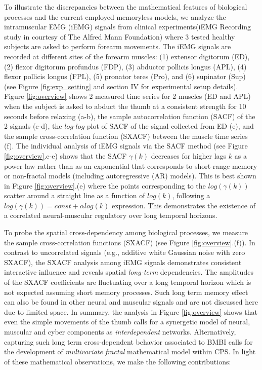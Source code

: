 To illustrate the discrepancies between the mathematical features of biological processes and the current employed memoryless models, we analyze the intramuscular EMG (iEMG) signals from clinical experiments(iEMG Recording study in courtesy of The Alfred Mann Foundation)  where 3 tested healthy subjects are asked to perform forearm movements. The iEMG signals are recorded at different sites of the forearm muscles: (1) extensor digitorum (ED), (2) flexor digitorum profundus (FDP), (3) abductor pollicis longus (APL), (4) flexor pollicis longus (FPL), (5) pronator teres (Pro), and (6) supinator (Sup) (see Figure \ref{fig:exp_setting} and section IV for experimental setup details). Figure \ref{fig:overview} shows 2 measured time series for 2 muscles (ED and APL) when the subject is asked to abduct the thumb at a consistent strength for 10 seconds before relaxing (a-b), the sample autocorrelation function (SACF) of the 2 signals (c-d), the $log$-$log$ plot of SACF of the signal collected from ED (e), and the sample cross-correlation function (SXACF) between the muscle time series (f). The individual analysis of iEMG signals via the SACF method (see Figure \ref{fig:overview}.c-e) shows that the SACF $\gamma(k)$ decreases for higher lags $k$ as a power law rather than as an exponential that corresponds to short-range memory or non-fractal models (including autoregressive (AR) models). This is best shown in Figure \ref{fig:overview}.(e) where the points corresponding to the $log(\gamma(k))$ scatter around a straight line as a function of $log(k)$, following a $log(\gamma(k))=const+\alpha log(k)$ expression. This demonstrates the existence of a correlated neural-muscular regulatory over long temporal horizons. 

To probe the spatial cross-dependency among biological processes, we measure the sample cross-correlation functions (SXACF) (see Figure \ref{fig:overview}.(f)). In contrast to uncorrelated signals (e.g., additive white Gaussian noise with zero SXACF), the SXACF analysis among iEMG signals demonstrates consistent interactive influence and reveals spatial \textit{long-term} dependencies. The amplitudes of the SXACF coefficients are fluctuating over a long temporal horizon which is not expected assuming short memory processes. Such long term memory effect can also be found in other neural and muscular signals and are not discussed here due to limited space. In summary, the analysis in Figure \ref{fig:overview} shows that even the simple movements of the thumb calls for a synergetic model of neural, muscular and cyber components as \textit{interdependent} networks. Alternatively, capturing such long term cross-dependent behavior associated to BMBI calls for the development of \textit{multivariate fractal} mathematical model within CPS. In light of these mathematical observations, we make the following contributions:

